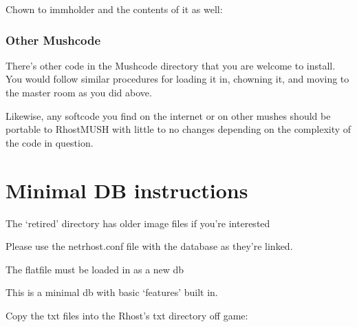 \documentclass[letterpaper,10pt,english]{sphinxmanual}
\begin{document}
\begin{sphinxVerbatim}[commandchars=\\\{\}]
\end{sphinxVerbatim}

\sphinxAtStartPar
Chown to immholder and the contents of it as well:

\begin{sphinxVerbatim}[commandchars=\\\{\}]
 
  
 
\end{sphinxVerbatim}


\subsubsection{Other Mushcode}
\label{\detokenize{gettingstarted:other-mushcode}}
\sphinxAtStartPar
There’s other code in the Mushcode directory that you are welcome to install.  You would follow similar procedures
for loading it in, chowning it, and moving to the master room as you did above.

\sphinxAtStartPar
Likewise, any softcode you find on the internet or on other mushes should be portable to RhostMUSH with little to
no changes depending on the complexity of the code in question.


\section{Minimal DB instructions}
\label{\detokenize{gettingstarted:minimal-db-instructions}}
\sphinxAtStartPar
The ‘retired’ directory has older image files if you’re interested

\sphinxAtStartPar
Please use the netrhost.conf file with the database as they’re linked.

\sphinxAtStartPar
The flatfile must be loaded in as a new db

\sphinxAtStartPar
This is a minimal db with basic ‘features’ built in.

\sphinxAtStartPar
Copy the txt files into the Rhost’s txt directory off game:

\begin{sphinxVerbatim}[commandchars=\\\{\}]
  
\end{sphinxVerbatim}
\end{document}
